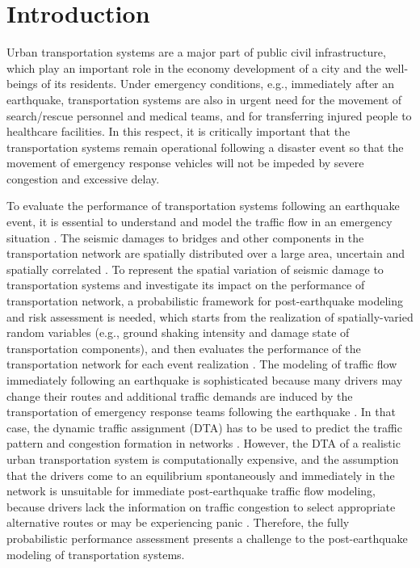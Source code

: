 \documentclass[review,11pt,nonatbib]{elsarticle}
\begin{document}
\section{Introduction}
Urban transportation systems are a major part of public civil infrastructure, which play an important role in the economy development of a city and the well-beings of its residents. Under emergency conditions, e.g., immediately after an earthquake, transportation systems are also in urgent need for the movement of search/rescue personnel and medical teams, and for transferring injured people to healthcare facilities. In this respect, it is critically important that the transportation systems remain operational following a disaster event so that the movement of emergency response vehicles will not be impeded by severe congestion and excessive delay.
\par To evaluate the performance of transportation systems following an earthquake event, it is essential to understand and model the traffic flow in an emergency situation \citep{brodsky1990emergency,jacques2014resilience,miller2016coupling}. The seismic damages to bridges and other components in the transportation network are spatially distributed over a large area, uncertain and spatially correlated \citep{Han2012Probabilistic}. To represent the spatial variation of seismic damage to transportation systems and investigate its impact on the performance of transportation network, a probabilistic framework for post-earthquake modeling and risk assessment is needed, which starts from the realization of spatially-varied random variables (e.g., ground shaking intensity and damage state of transportation components), and then evaluates the performance of the transportation network for each event realization \citep{Grossi2005Catastrophe,Han2012Probabilistic,Miller2015Estimating}. The modeling of traffic flow immediately following an earthquake is sophisticated because many drivers may change their routes and additional traffic demands are induced by the transportation of emergency response teams following the earthquake \citep{ahn2014study}. In that case, the dynamic traffic assignment (DTA) has to be used to predict the traffic pattern and congestion formation in networks \citep{Szeto2011A,Tanimoto2015}. However, the DTA of a realistic urban transportation system is computationally expensive, and the assumption that the drivers come to an equilibrium spontaneously and immediately in the network is unsuitable for immediate post-earthquake traffic flow modeling, because drivers lack the information on traffic congestion to select appropriate alternative routes or may be experiencing panic \citep{pel2011modelling}. Therefore, the fully probabilistic performance assessment presents a challenge to the post-earthquake modeling of transportation systems.
\end{document}

